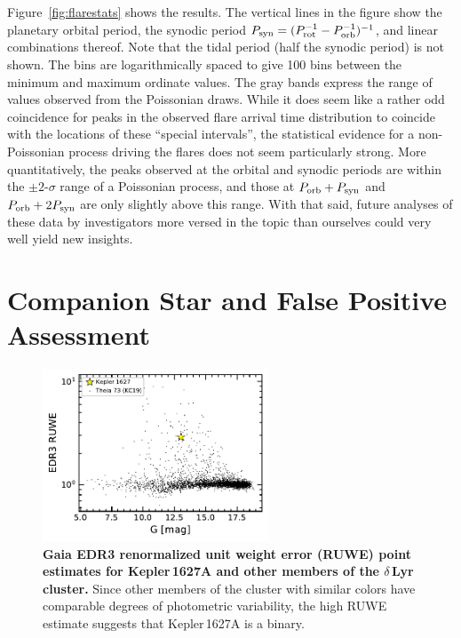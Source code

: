 \documentclass[12pt,modern,twocolumn,tighten]{aastex63}
\begin{document}
Figure~\ref{fig:flarestats} shows the results.  The vertical lines in
the figure show the planetary orbital period, the synodic period
$P_{\rm syn} = (P_{\rm rot}^{-1} - P_{\rm orb}^{-1})^{-1}$, and linear
combinations thereof.  Note that the tidal period (half the synodic
period) is not shown.  The bins are logarithmically spaced to give 100
bins between the minimum and maximum ordinate values.  The gray bands
express the range of values observed from the Poissonian draws.  While
it does seem like a rather odd coincidence for peaks in the observed
flare arrival time distribution to coincide with the locations of
these ``special intervals'', the statistical evidence for a
non-Poissonian process driving the flares does not seem particularly
strong.  More quantitatively, the peaks observed at the orbital and
synodic periods are within the $\pm 2$-$\sigma$ range of a
Poissonian process, and those at $P_{\rm orb}+P_{\rm syn}$ and $P_{\rm
orb}+2P_{\rm syn}$ are only slightly above this range. 
With that said,
future analyses of these data by investigators more versed in the
topic than ourselves could very well yield new insights.



\section{Companion Star and False Positive Assessment}
\label{app:companionstar}

\begin{figure}[t]
	\begin{center}
		\leavevmode
		\includegraphics[width=0.6\textwidth]{f6.pdf}
	\end{center}
	\vspace{-0.7cm}
	\caption{
    {\bf Gaia EDR3 renormalized unit weight error (RUWE) point
    estimates for Kepler\,1627A and other members of
    the $\delta$\,Lyr cluster.}  Since other members of the cluster
    with similar colors have comparable degrees of photometric
    variability, the high RUWE estimate suggests that Kepler\,1627A is
    a binary. 
		\label{fig:ruwe}
	}
\end{figure}
\end{document}
